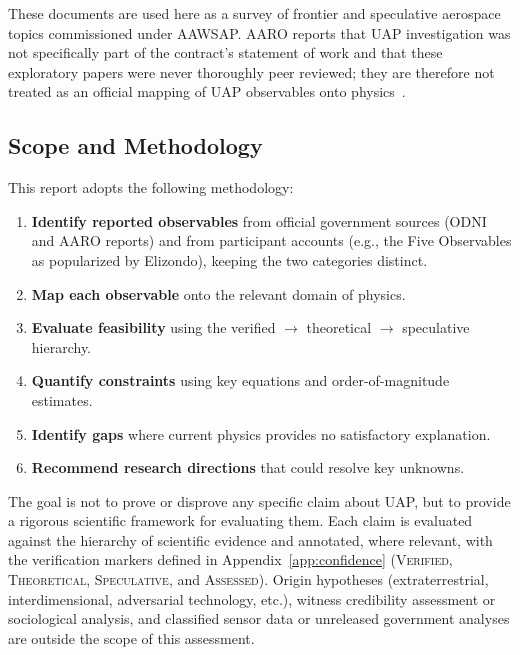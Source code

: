 \documentclass[aps,prd,twocolumn,superscriptaddress,nofootinbib,floatfix]{revtex4-2}
\begin{document}
These documents are used here as a survey of frontier and speculative aerospace
topics commissioned under AAWSAP. AARO reports that UAP investigation was not
specifically part of the contract's statement of work and that these exploratory
papers were never thoroughly peer reviewed; they are therefore not treated as an
official mapping of UAP observables onto physics~\cite{AARO2024}.

\subsection{Scope and Methodology}\label{sec:scope}

This report adopts the following methodology:
\begin{enumerate}
  \item \textbf{Identify reported observables} from official government sources
        (ODNI and AARO reports) and from participant accounts (e.g., the Five
        Observables as popularized by Elizondo), keeping the two categories
        distinct.
  \item \textbf{Map each observable} onto the relevant domain of physics.
  \item \textbf{Evaluate feasibility} using the verified $\to$ theoretical
        $\to$ speculative hierarchy.
  \item \textbf{Quantify constraints} using key equations and order-of-magnitude
        estimates.
  \item \textbf{Identify gaps} where current physics provides no satisfactory
        explanation.
  \item \textbf{Recommend research directions} that could resolve key unknowns.
\end{enumerate}

The goal is not to prove or disprove any specific claim about UAP, but to provide
a rigorous scientific framework for evaluating them. Each claim is evaluated
against the hierarchy of scientific evidence and annotated, where relevant, with
the verification markers defined in Appendix~\ref{app:confidence}
(\textsc{Verified}, \textsc{Theoretical}, \textsc{Speculative}, and
\textsc{Assessed}). Origin hypotheses (extraterrestrial, interdimensional,
adversarial technology, etc.), witness credibility assessment or sociological
analysis, and classified sensor data or unreleased government analyses are outside
the scope of this assessment.
\end{document}
